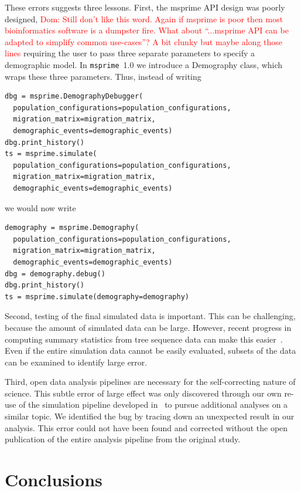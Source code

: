 \documentclass{article}
\newcommand{\msprime}[0]{\texttt{msprime}}
\newcommand{\dncomment}[1]{{\textcolor{red}{Dom: #1}}}
\begin{document}
These errors suggests three lessons.
First, the msprime API design was poorly designed,
\dncomment{Still don't like this word. Again if msprime is poor then most bioinformatics
software is a dumpster fire. What about ``...msprime API can be adapted to
simplify common use-cases''? A bit clunky but maybe along those lines
}
requiring the user to pass
three separate parameters to specify a demographic model.
In \msprime\ 1.0 we introduce
a Demography class, which wraps these three parameters.
Thus, instead of writing
\begin{lstlisting}[frame=single]
dbg = msprime.DemographyDebugger(
  population_configurations=population_configurations,
  migration_matrix=migration_matrix,
  demographic_events=demographic_events)
dbg.print_history()
ts = msprime.simulate(
  population_configurations=population_configurations,
  migration_matrix=migration_matrix,
  demographic_events=demographic_events)
\end{lstlisting}
we would now write
\begin{lstlisting}[frame=single]
demography = msprime.Demography(
  population_configurations=population_configurations,
  migration_matrix=migration_matrix,
  demographic_events=demographic_events)
dbg = demography.debug()
dbg.print_history()
ts = msprime.simulate(demography=demography)
\end{lstlisting}

Second, testing of the final simulated data is important. This can be challenging,
because the amount of simulated data can be large. However, recent progress in
computing summary statistics from tree sequence data can make this
easier~\citep{ralph2020efficiently}.
Even if the entire simulation data cannot be easily evaluated, subsets of the data
can be examined to identify large error.

Third, open data analysis pipelines are necessary for the self-correcting nature of science.
This subtle error of large effect was only discovered through our own re-use of
the simulation pipeline developed in~\citep{martin2017human} to pursue
additional analyses on a similar topic. We identified the bug by tracing down an unexpected
result in our analysis. This error could not have been found and corrected without the open
publication of the entire analysis pipeline from the original study.

\section{Conclusions}
\end{document}
